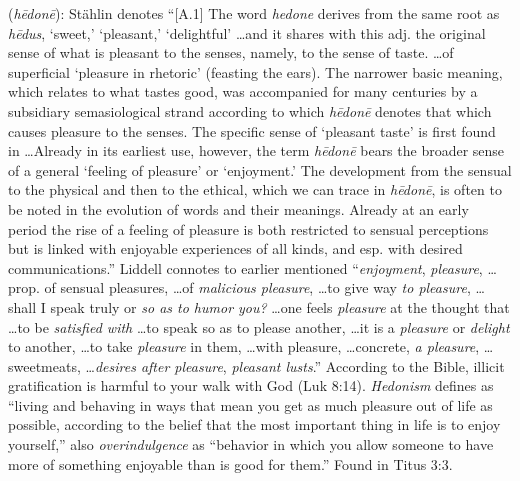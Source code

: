\item[Overindulgence,]

(\textit{hēdonē}):
Stählin denotes ``[A.1] The word \emph{hedone} derives from the same root as \emph{hēdus}, `sweet,' `pleasant,' `delightful' \ldots and it shares with this adj. the original sense of what is pleasant to the senses, namely, to the sense of taste. \ldots of superficial `pleasure in rhetoric' (feasting the ears). The narrower basic meaning, which relates to what tastes good, was accompanied for many centuries by a subsidiary semasiological strand according to which \emph{hēdonē} denotes that which causes pleasure to the senses. The specific sense of `pleasant taste' is first found in \ldots Already in its earliest use, however, the term \emph{hēdonē} bears the broader sense of a general `feeling of pleasure' or `enjoyment.' The development from the sensual to the physical and then to the ethical, which we can trace in \emph{hēdonē}, is often to be noted in the evolution of words and their meanings. Already at an early period the rise of a feeling of pleasure is both restricted to sensual perceptions but is linked with enjoyable experiences of all kinds, and esp. with desired communications.''
Liddell connotes to earlier mentioned ``\emph{enjoyment}, \emph{pleasure}, \ldots prop. of sensual pleasures, \ldots of \emph{malicious pleasure}, \ldots to give way \emph{to pleasure}, \ldots shall I speak truly or \emph{so as to humor you?} \ldots one feels \emph{pleasure} at the thought that \ldots to be \emph{satisfied with} \ldots to speak so as to please another, \ldots it is a \emph{pleasure} or \emph{delight} to another, \ldots to take \emph{pleasure} in them, \ldots with pleasure, \ldots concrete, \emph{a pleasure}, \ldots sweetmeats, \ldots \emph{desires after pleasure}, \emph{pleasant lusts}.'' According to the Bible, illicit gratification is harmful to your walk with God (Luk 8:14). \emph{Hedonism} defines as ``living and behaving in ways that mean you get as much pleasure out of life as possible, according to the belief that the most important thing in life is to enjoy yourself,'' also \emph{overindulgence} as ``behavior in which you allow someone to have more of something enjoyable than is good for them.''
Found in Titus 3:3.
